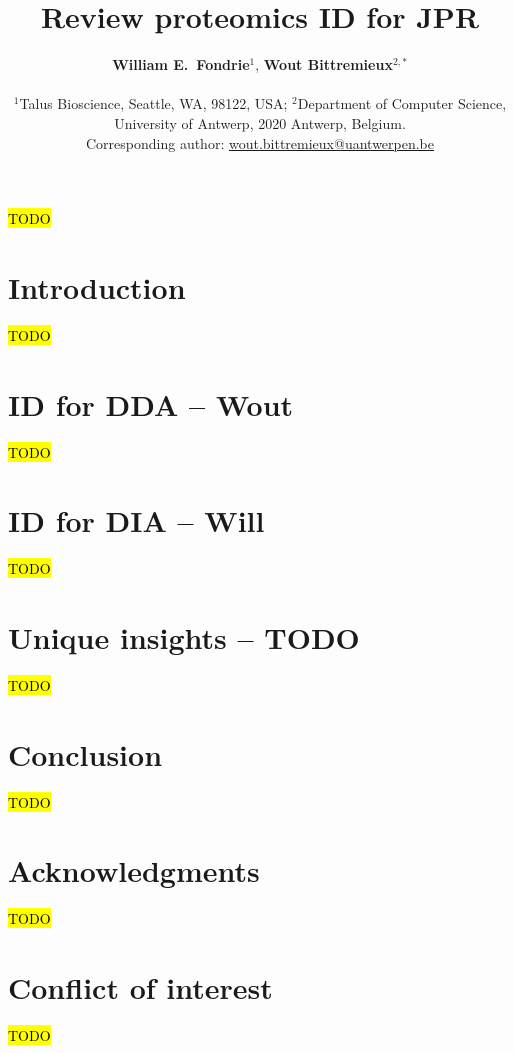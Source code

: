\documentclass{jpr}
\title{Review proteomics ID for JPR}
\author{%
{\small
\textbf{William E.\ Fondrie}$^{1}$,
\textbf{Wout Bittremieux}$^{2,*}$\\
}
{\footnotesize
$^{1}$Talus Bioscience, Seattle, WA, 98122, USA;
$^{2}$Department of Computer Science, University of Antwerp, 2020 Antwerp, Belgium.
\par
Corresponding author:
\href{mailto:wout.bittremieux@uantwerpen.be}{wout.bittremieux@uantwerpen.be}
}
}
\date{}
\begin{document}
\begin{titleabstract}
\hl{TODO}
\end{titleabstract}




\section{Introduction}

\hl{TODO}

\section{ID for DDA -- Wout}

\hl{TODO}

\section{ID for DIA -- Will}

\hl{TODO}

\section{Unique insights -- TODO}

\hl{TODO}

\section{Conclusion}

\hl{TODO}

\section*{Acknowledgments}

\hl{TODO}

\section*{Conflict of interest}

\hl{TODO}

\printbibliography
\end{document}
